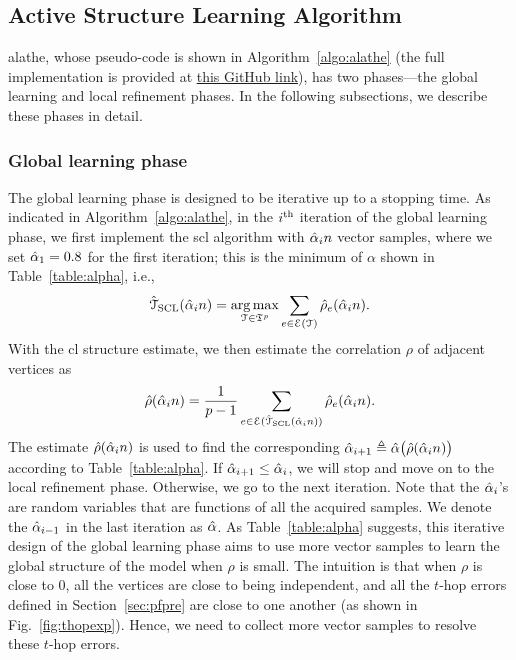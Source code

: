 \subsection{Active Structure Learning Algorithm}
 \ac{alathe}, whose pseudo-code is shown in Algorithm~\ref{algo:alathe} (the full implementation is provided at   \textcolor{blue}{\href{https://github.com/Zhang-Fengzhuo/Active-LATHE}{this    GitHub link}}), has two phases---the global learning  and  local refinement phases. In the following subsections, we describe these phases in detail.
\subsubsection{Global learning phase}
The global learning phase is designed to be iterative up to a stopping time. As indicated in Algorithm~\ref{algo:alathe}, in the $i^{{\rm th}}$ iteration of the global learning phase, we first implement the \ac{scl} algorithm 
with $\hat{\alpha}_{i}n$ vector samples, where we set $\hat{\alpha}_{1}=0.8$ for the first iteration; this is the minimum   of $\alpha$ shown in Table~\ref{table:alpha}, i.e., 
\begin{align}\label{eq:clvariant}
	\hat{\mathcal{T}}_{\rm{SCL}}(\hat{\alpha}_{i}n)=\operatorname*{arg\,max}_{\mathcal{T}\in\mathfrak{T}^{p}} \sum_{e\in\mathcal{E}(\mathcal{T})} \hat{\rho}_{e}(\hat{\alpha}_{i}n).
\end{align}
With the \ac{cl} structure estimate, we then estimate the correlation $\rho$ of adjacent vertices as
\begin{align}\label{eq:rhohat}
	\hat{\rho}(\hat{\alpha}_{i}n)=\frac{1}{p-1}\sum_{e\in\mathcal{E}(\hat{\mathcal{T}}_{\rm{SCL}}(\hat{\alpha}_{i}n) )}\hat{\rho}_{e}(\hat{\alpha}_{i}n) .
\end{align}
The estimate $\hat{\rho}(\hat{\alpha}_{i}n)$ is used to find the corresponding $\hat{\alpha}_{i+1} \triangleq \hat{\alpha}\big(\hat{\rho}(\hat{\alpha}_{i}n)\big)$ according to Table~\ref{table:alpha}. If $\hat{\alpha}_{i+1}\leq \hat{\alpha}_{i}$, we will stop and move on to the local refinement phase. Otherwise, we go to the next 
iteration. Note that   the $\hat{\alpha}_{i}$'s are  random variables that are  functions of all the acquired samples. We denote the $\hat{\alpha}_{i-1}$ in the last iteration as $\hat{\alpha}$. As Table~\ref{table:alpha} suggests, this iterative design of the global learning phase aims to use more vector samples to learn the global structure of the model when $\rho$ is small. 
The intuition is that when $\rho$ is close to 0, all the vertices are close to being independent, and all the $t$-hop errors defined in Section~\ref{sec:pfpre} are close to one another (as shown in Fig.~\ref{fig:thopexp}). Hence, we need to collect more vector samples to resolve these $t$-hop errors.


